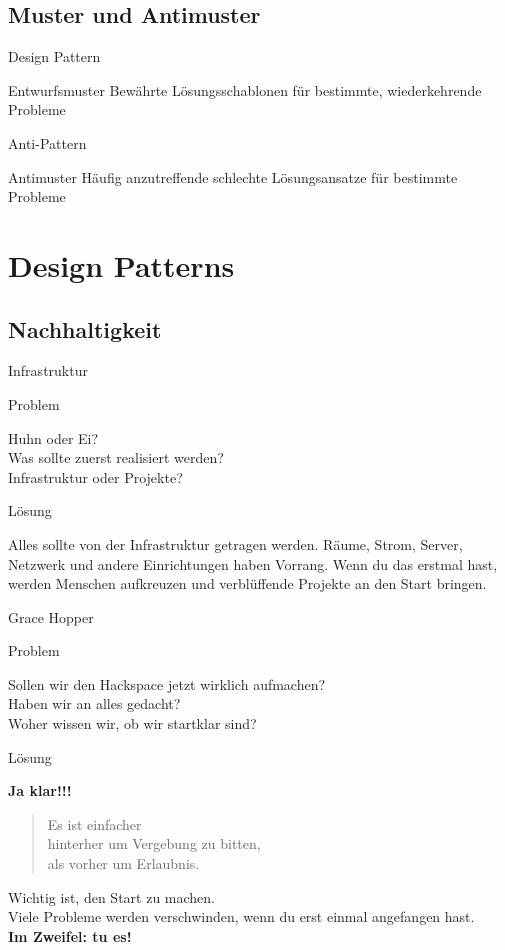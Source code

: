 \documentclass[aspectratio=1610]{beamer}
\newcommand{\concept}[2]{
  \begin{block}{#1}
    \pause
    #2
  \end{block}
}
\newcommand{\pattern}[2]{
  \begin{alertblock}{Problem}
    #1
  \end{alertblock}
  \pause
  \begin{exampleblock}{Lösung}
    #2
  \end{exampleblock}
}
\begin{document}
  \subsection{Muster und Antimuster}

  \begin{frame}{Design Pattern}
    \concept{Entwurfsmuster}{Bewährte Lösungsschablonen für bestimmte, wiederkehrende Probleme}
  \end{frame}

  \begin{frame}{Anti-Pattern}
    \concept{Antimuster}{Häufig anzutreffende schlechte Lösungsansatze für bestimmte Probleme}
  \end{frame}

  \section{Design Patterns}

  \subsection{Nachhaltigkeit}

  \begin{frame}{Infrastruktur}
    \pattern{
      Huhn oder Ei?\\
      Was sollte zuerst realisiert werden?\\
      Infrastruktur oder Projekte?
    }{
      Alles sollte von der Infrastruktur getragen werden. Räume, Strom, Server,
      Netzwerk und andere Einrichtungen haben Vorrang. Wenn du das erstmal hast,
      werden Menschen aufkreuzen und verblüffende Projekte an den Start
      bringen.
    }
  \end{frame}

  \begin{frame}{Grace Hopper}
    \pattern{
      Sollen wir den Hackspace jetzt wirklich aufmachen?\\
      Haben wir an alles gedacht?\\
      Woher wissen wir, ob wir startklar sind?
    }{
      \textbf{Ja klar!!!}
      \pause
      \begin{quote}
        Es ist einfacher\\
        hinterher um Vergebung zu bitten,\\
        als vorher um Erlaubnis.
      \end{quote}
      \pause
      Wichtig ist, den Start zu machen.\\
      Viele Probleme werden verschwinden, wenn du erst einmal angefangen hast.\\
      \textbf{Im Zweifel: tu es!}
    }
  \end{frame}
\end{document}
